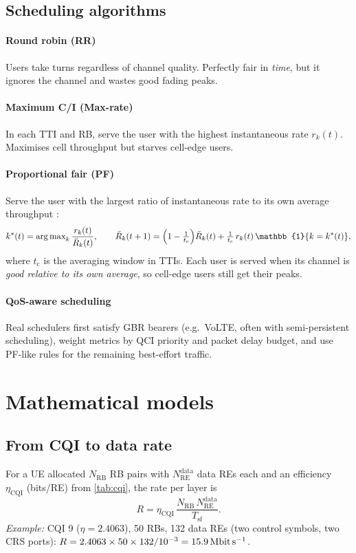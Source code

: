 \documentclass[11pt,a4paper]{article}
\begin{document}
\subsection{Scheduling algorithms}
\paragraph{Round robin (RR)} Users take turns regardless of channel quality. Perfectly fair in
\emph{time}, but it ignores the channel and wastes good fading peaks.
\paragraph{Maximum C/I (Max-rate)} In each TTI and RB, serve the user with the highest instantaneous
rate $r_k(t)$. Maximises cell throughput but starves cell-edge users.
\paragraph{Proportional fair (PF)} Serve the user with the largest ratio of instantaneous rate to
its own average throughput \cite{jalali2000hdr}:
\begin{equation}\label{eq:pfmetric}
  k^\ast(t) = \argmax_k \frac{r_k(t)}{\bar R_k(t)}, \qquad
  \bar R_k(t+1) = \Bigl(1-\tfrac{1}{t_\mathrm{c}}\Bigr)\bar R_k(t) + \tfrac{1}{t_\mathrm{c}}\,r_k(t)\,\mathbb{1}\{k = k^\ast(t)\},
\end{equation}
where $t_\mathrm{c}$ is the averaging window in TTIs. Each user is served when its channel is
\emph{good relative to its own average}, so cell-edge users still get their peaks.
\paragraph{QoS-aware scheduling} Real schedulers first satisfy GBR bearers (e.g.\ VoLTE, often with
semi-persistent scheduling), weight metrics by QCI priority and packet delay budget, and use PF-like
rules for the remaining best-effort traffic.

\section{Mathematical models}

\subsection{From CQI to data rate}\label{sec:rate}
For a UE allocated $N_{\mathrm{RB}}$ RB pairs with $N_{\mathrm{RE}}^{\mathrm{data}}$ data REs each and
an efficiency $\eta_{\mathrm{CQI}}$ (bits/RE) from \cref{tab:cqi}, the rate per layer is
\begin{equation}\label{eq:cqirate}
  R = \eta_{\mathrm{CQI}}\,\frac{N_{\mathrm{RB}}\,N_{\mathrm{RE}}^{\mathrm{data}}}{T_{\mathrm{sf}}}.
\end{equation}
\emph{Example:} CQI 9 ($\eta = 2.4063$), 50 RBs, 132 data REs (two control symbols, two CRS ports):
$R = 2.4063\times50\times132/10^{-3} = \qty{15.9}{\mega\bit\per\second}$.
\end{document}
